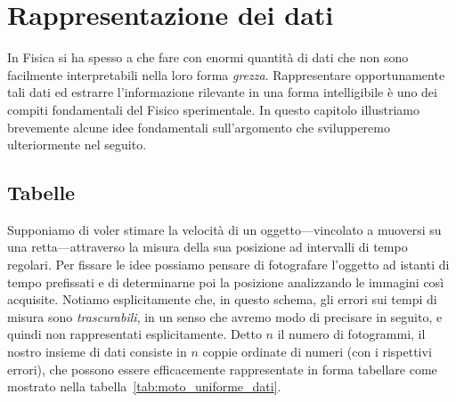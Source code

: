 \chapter{Rappresentazione dei dati}
\label{sec:rappresentazione_dati}

In Fisica si ha spesso a che fare con enormi quantità di dati che non sono
facilmente interpretabili nella loro forma \emph{grezza}. Rappresentare
opportunamente tali dati ed estrarre l'informazione rilevante in una forma
intelligibile è uno dei compiti fondamentali del Fisico sperimentale.
In questo capitolo illustriamo brevemente alcune idee fondamentali
sull'argomento che svilupperemo ulteriormente nel seguito.


\section{Tabelle}

Supponiamo di voler stimare la velocità di un oggetto---vincolato a muoversi
su una retta---attraverso la misura della sua posizione ad intervalli di tempo
regolari. Per fissare le idee possiamo pensare di fotografare l'oggetto
ad istanti di tempo prefissati e di determinarne poi la posizione analizzando le
immagini così acquisite. Notiamo esplicitamente che, in questo schema, gli
errori sui tempi di misura sono \emph{trascurabili}, in un senso che avremo
modo di precisare in seguito, e quindi non rappresentati esplicitamente.
Detto $n$ il numero di fotogrammi, il nostro insieme di dati consiste in $n$
coppie ordinate di numeri (con i rispettivi errori), che possono essere
efficacemente rappresentate in forma tabellare come mostrato
nella tabella~\ref{tab:moto_uniforme_dati}.

\begin{table}[htbp]
\end{table}

